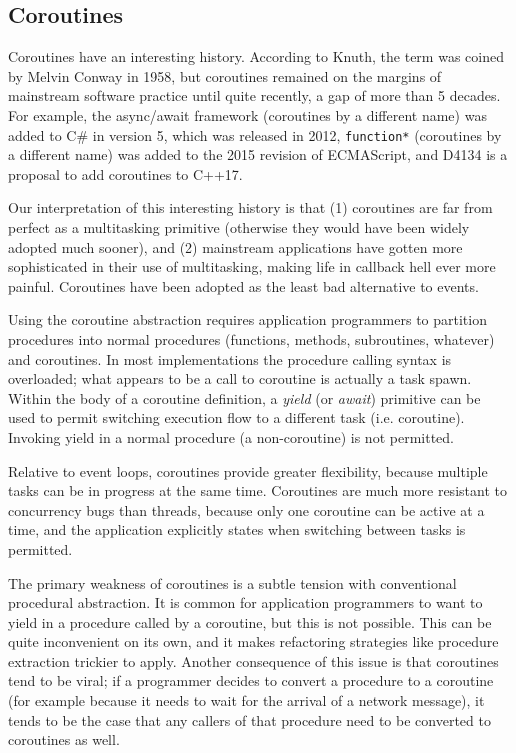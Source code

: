 \documentclass[10pt,preprint]{sigplanconf}
\begin{document}
\subsection{Coroutines}

Coroutines have an interesting history.
According to Knuth, the term was coined by Melvin Conway in 1958, but coroutines remained on the margins of mainstream software practice until quite recently, a gap of more than 5 decades.
For example, the async/await framework (coroutines by a different name) was added to C\# in version 5, which was released in 2012, \texttt{function*} (coroutines by a different name) was added to the 2015 revision of ECMAScript, and D4134 is a proposal to add coroutines to C++17.

Our interpretation of this interesting history is that (1) coroutines are far from perfect as a multitasking primitive (otherwise they would have been widely adopted much sooner), and (2) mainstream applications have gotten more sophisticated in their use of multitasking, making life in callback hell ever more painful.
Coroutines have been adopted as the least bad alternative to events.

Using the coroutine abstraction requires application programmers to partition procedures into normal procedures (functions, methods, subroutines, whatever) and coroutines.
In most implementations the procedure calling syntax is overloaded; what appears to be a call to coroutine is actually a task spawn.
Within the body of a coroutine definition, a \emph{yield} (or \emph{await}) primitive can be used to permit switching execution flow to a different task (i.e. coroutine).
Invoking yield in a normal procedure (a non-coroutine) is not permitted.

Relative to event loops, coroutines provide greater flexibility, because multiple tasks can be in progress at the same time.
Coroutines are much more resistant to concurrency bugs than threads, because only one coroutine can be active at a time, and the application explicitly states when switching between tasks is permitted.

The primary weakness of coroutines is a subtle tension with conventional procedural abstraction.
It is common for application programmers to want to yield in a procedure called by a coroutine, but this is not possible.
This can be quite inconvenient on its own, and it makes refactoring strategies like procedure extraction trickier to apply.
Another consequence of this issue is that coroutines tend to be viral; if a programmer decides to convert a procedure to a coroutine (for example because it needs to wait for the arrival of a network message), it tends to be the case that any callers of that procedure need to be converted to coroutines as well.
\end{document}
